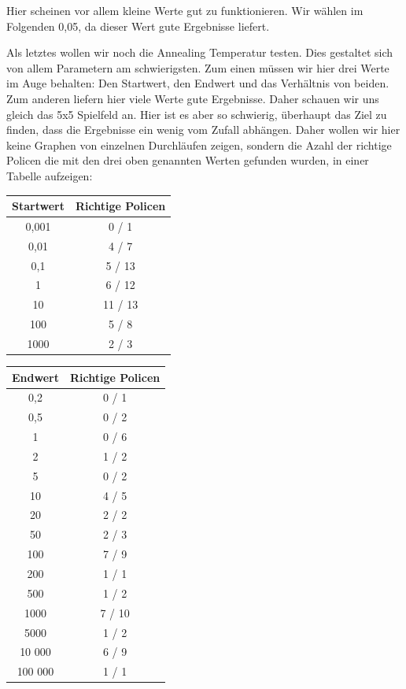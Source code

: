 Hier scheinen vor allem kleine Werte gut zu funktionieren. Wir wählen im Folgenden 0,05, da dieser Wert gute Ergebnisse liefert.

Als letztes wollen wir noch die Annealing Temperatur testen. Dies gestaltet sich von allem Parametern am schwierigsten. Zum einen müssen wir hier drei Werte im Auge behalten: Den Startwert, den Endwert und das Verhältnis von beiden. Zum anderen liefern hier viele Werte gute Ergebnisse. Daher schauen wir uns gleich das 5x5 Spielfeld an. Hier ist es aber so schwierig, überhaupt das Ziel zu finden, dass die Ergebnisse ein wenig vom Zufall abhängen. Daher wollen wir hier keine Graphen von einzelnen Durchläufen zeigen, sondern die Azahl der richtige Policen die mit den drei oben genannten Werten gefunden wurden, in einer Tabelle aufzeigen:

\begin{table}[H]
	\centering
	\begin{tabular}{c|c}
	Startwert		& Richtige Policen	\\
	\hline
	0,001		& 	0 / 1			\\
	\hline
	0,01			& 	4 / 7			\\
	\hline
	0,1			& 	5 / 13		\\
	\hline
	1			& 	6 / 12		\\
	\hline
	10 			&	11 / 13		\\
	\hline
	100			&	5 / 8			\\
	\hline
	1000			&	2 / 3
	\end{tabular}
\end{table} 

\begin{table}[H]
	\centering
	\begin{tabular}{c|c}
	Endwert		& Richtige Policen	\\
	\hline
	0,2			&	0 / 1			\\
	\hline
	0,5			&	0 / 2			\\
	\hline
	1			& 	0 / 6			\\
	\hline
	2			& 	1 / 2			\\
	\hline
	5			& 	0 / 2			\\
	\hline
	10			& 	4 / 5			\\
	\hline
	20			& 	2 / 2			\\
	\hline
	50			& 	2 / 3			\\
	\hline
	100			& 	7 / 9			\\
	\hline
	200			& 	1 / 1			\\
	\hline
	500			& 	1 / 2			\\
	\hline
	1000			& 	7 / 10		\\
	\hline
	5000			& 	1 / 2			\\
	\hline
	10 000		&	6 / 9			\\
	\hline
	100 000		&	1 / 1
	\end{tabular}
\end{table} 

